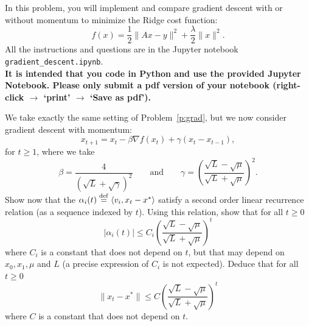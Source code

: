 \documentclass[11pt,nocut]{article}
\begin{document}
\vspace{5mm}

\begin{problem}[3 points]
	In this problem, you will implement and compare gradient descent with or without momentum to minimize the Ridge cost function:
	$$
	f(x) = \frac{1}{2} \|Ax-y\|^2 + \frac{\lambda}{2} \|x\|^2.
	$$
	All the instructions and questions are in the Jupyter notebook \texttt{gradient\_descent.ipynb}.
	\\

	\textbf{It is intended that you code in Python and use the provided Jupyter Notebook. Please only submit a pdf version of your notebook (right-click $\to$ `print' $\to$ `Save as pdf').}
\end{problem}


\vspace{5mm}

\begin{problem}[$\star$]
	We take exactly the same setting of Problem~\ref{p:grad}, but we now consider gradient descent with momentum:
$$
x_{t+1} = x_t - \beta \nabla f(x_t) + \gamma(x_t -x_{t-1}),
$$
for $t \geq 1$,
where we take
$$
\beta = \frac{4}{(\sqrt{L} + \sqrt{\gamma})^2}
\qquad \text{and} \qquad
\gamma = \left(\frac{\sqrt{L}-\sqrt{\mu}}{\sqrt{L}+\sqrt{\mu}}\right)^{\! 2}.
$$
Show now that the $\alpha_i(t) \overset{\rm def}{=} \langle v_i, x_t - x^* \rangle$ satisfy a second order linear recurrence relation (as a sequence indexed by $t$). Using this relation, show that for all $t \geq 0$
$$
|\alpha_i(t)| \leq C_i \left(\frac{\sqrt{L}-\sqrt{\mu}}{\sqrt{L} + \sqrt{\mu}}\right)^{\! t}
$$
where $C_i$ is a constant that does not depend on $t$, but that may depend on $x_0,x_1, \mu$ and $L$ (a precise expression of $C_i$ is not expected). Deduce that for all $t \geq 0$
$$
\|x_t - x^*\| \leq C \left(\frac{\sqrt{L}-\sqrt{\mu}}{\sqrt{L} + \sqrt{\mu}}\right)^{\! t}
$$
where $C$ is a constant that does not depend on $t$.
\end{problem}




\vspace{1cm}
\centerline{}

%
%
\end{document}
